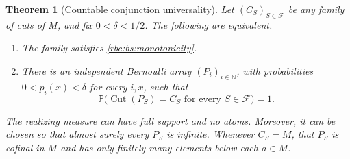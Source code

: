 \documentclass[11pt]{article}
\numberwithin{equation}{section}
\newtheorem{theorem}{Theorem}[section]
\theoremstyle{definition}
\theoremstyle{remark}
\newcommand{\N}{\mathbb N}
\newcommand{\Cut}{\operatorname{Cut}}
\newcommand{\Prob}{\mathbb P}
\begin{document}
\begin{theorem}[Countable conjunction universality]
\label{rbc:bs:universality}
Let $(C_S)_{S\in\mathcal F}$ be any family of cuts of $M$, and fix
$0<\delta<1/2$.  The following are equivalent.
\begin{enumerate}
\item The family satisfies \eqref{rbc:bs:monotonicity}.
\item There is an independent Bernoulli array $(P_i)_{i\in\N}$, with
      probabilities $0<p_i(x)<\delta$ for every $i,x$, such that
      \begin{equation}
      \label{rbc:bs:simultaneous}
        \Prob\bigl(\Cut(P_S)=C_S\text{ for every }S\in\mathcal F\bigr)=1.
      \end{equation}
\end{enumerate}
The realizing measure can have full support and no atoms.  Moreover, it can
be chosen so that almost surely every $P_S$ is infinite.  Whenever $C_S=M$,
that $P_S$ is cofinal in $M$ and has only finitely many elements below each
$a\in M$.
\end{theorem}
\end{document}
